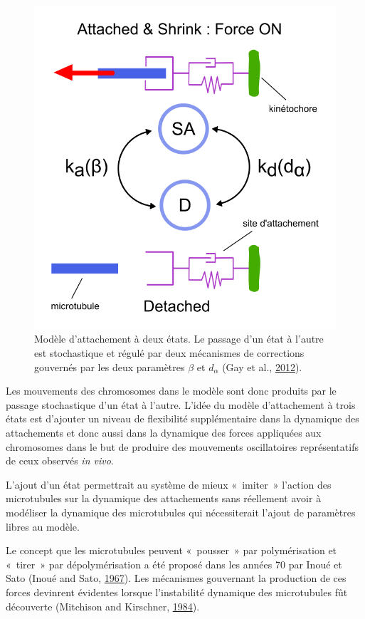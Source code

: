 \documentclass[12pt,a4paper,twoside,openright]{book}
\begin{document}
\begin{figure}[htbp]
\centering
\includegraphics{figures/results/modelling/two_states.png}
\caption[Modèle d'attachement à deux états]{\label{fig:two_states}Modèle
d'attachement à deux états. Le passage d'un état à l'autre est
stochastique et régulé par deux mécanismes de corrections gouvernés par
les deux paramètres \(\beta\) et \(d_\alpha\) (Gay et al.,
\protect\hyperlink{ref-Gay2012a}{2012}).}
\end{figure}

Les mouvements des chromosomes dans le modèle sont donc produits par le
passage stochastique d'un état à l'autre. L'idée du modèle d'attachement
à trois états est d'ajouter un niveau de flexibilité supplémentaire dans
la dynamique des attachements et donc aussi dans la dynamique des forces
appliquées aux chromosomes dans le but de produire des mouvements
oscillatoires représentatifs de ceux observés \emph{in vivo}.

L'ajout d'un état permettrait au système de mieux «~imiter~» l'action
des microtubules sur la dynamique des attachements sans réellement avoir
à modéliser la dynamique des microtubules qui nécessiterait l'ajout de
paramètres libres au modèle.

Le concept que les microtubules peuvent «~pousser~» par polymérisation
et «~tirer~» par dépolymérisation a été proposé dans les années 70 par
Inoué et Sato (Inoué and Sato, \protect\hyperlink{ref-Inoue1967}{1967}).
Les mécanismes gouvernant la production de ces forces devinrent
évidentes lorsque l'instabilité dynamique des microtubules fût
découverte (Mitchison and Kirschner,
\protect\hyperlink{ref-Mitchison1984}{1984}).
\end{document}
